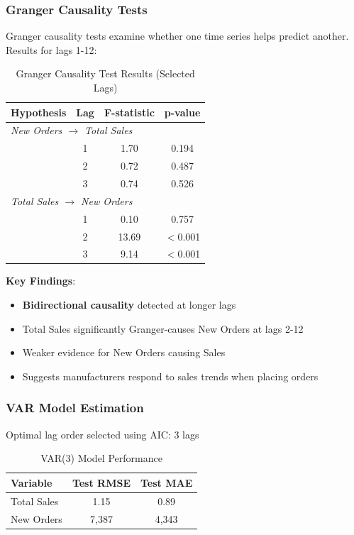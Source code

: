 \documentclass[12pt]{article}
\begin{document}
\subsubsection*{Granger Causality Tests}

Granger causality tests examine whether one time series helps predict another. Results for lags 1-12:

\begin{table}[H]
\centering
\caption{Granger Causality Test Results (Selected Lags)}
\begin{tabular}{lccc}
\toprule
Hypothesis & Lag & F-statistic & p-value \\
\midrule
\multicolumn{4}{l}{\textit{New Orders $\rightarrow$ Total Sales}} \\
& 1 & 1.70 & 0.194 \\
& 2 & 0.72 & 0.487 \\
& 3 & 0.74 & 0.526 \\
\midrule
\multicolumn{4}{l}{\textit{Total Sales $\rightarrow$ New Orders}} \\
& 1 & 0.10 & 0.757 \\
& 2 & 13.69 & $<$0.001 \\
& 3 & 9.14 & $<$0.001 \\
\bottomrule
\end{tabular}
\end{table}

\textbf{Key Findings}:
\begin{itemize}
    \item \textbf{Bidirectional causality} detected at longer lags
    \item Total Sales significantly Granger-causes New Orders at lags 2-12
    \item Weaker evidence for New Orders causing Sales
    \item Suggests manufacturers respond to sales trends when placing orders
\end{itemize}

\subsubsection*{VAR Model Estimation}

Optimal lag order selected using AIC: 3 lags

\begin{table}[H]
\centering
\caption{VAR(3) Model Performance}
\begin{tabular}{lcc}
\toprule
Variable & Test RMSE & Test MAE \\
\midrule
Total Sales & 1.15 & 0.89 \\
New Orders & 7,387 & 4,343 \\
\bottomrule
\end{tabular}
\end{table}
\end{document}
